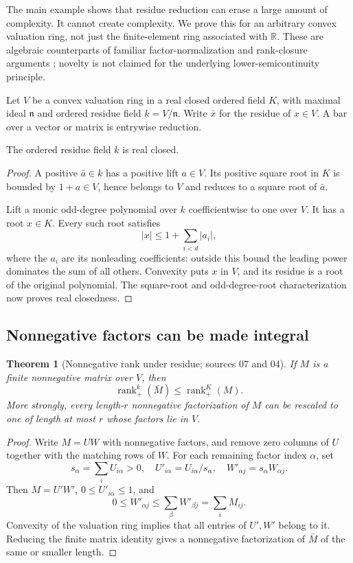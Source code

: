 \documentclass[11pt,a4paper]{article}
\numberwithin{equation}{section}
\newtheorem{theorem}{Theorem}[section]
\theoremstyle{plain}
\newcommand{\R}{\mathbb R}
\newcommand{\rankp}{\operatorname{rank}_{+}}
\begin{document}
The main example shows that residue reduction can erase a large amount of
complexity. It cannot create complexity. We prove this for an arbitrary
convex valuation ring, not just the finite-element ring associated with
$\R$. These are algebraic counterparts of familiar factor-normalization
and rank-closure arguments \cite{ic:psdrank}; novelty is not claimed for the
underlying lower-semicontinuity principle.

Let $V$ be a convex valuation ring in a real closed ordered field $K$,
with maximal ideal $\mathfrak n$ and ordered residue field
$k=V/\mathfrak n$. Write $\bar x$ for the residue of $x\in V$.
A bar over a vector or matrix is entrywise reduction.

\begin{lemma}\label{poly:ic:lem:residuercf}
The ordered residue field $k$ is real closed.
\end{lemma}
\begin{proof}
A positive $\bar a\in k$ has a positive lift $a\in V$. Its positive
square root in $K$ is bounded by $1+a\in V$, hence belongs to $V$ and
reduces to a square root of $\bar a$.

Lift a monic odd-degree polynomial over $k$ coefficientwise to one over
$V$. It has a root $x\in K$. Every such root satisfies
\[
 |x|\leq 1+\sum_{i<d}|a_i|,
\]
where the $a_i$ are its nonleading coefficients: outside this bound the
leading power dominates the sum of all others. Convexity puts $x$ in
$V$, and its residue is a root of the original polynomial. The square-root
and odd-degree-root characterization now proves real closedness.
\end{proof}

\subsection{Nonnegative factors can be made integral}
\begin{theorem}[Nonnegative rank under residue; sources 07 and 04]\label{poly:ic:thm:residuenonnegative}\label{poly:bao:prop:normalization}
If $M$ is a finite nonnegative matrix over $V$, then
\[
 \rankp^{k}(\bar M)\leq\rankp^{K}(M).
\]
More strongly, every length-$r$ nonnegative factorization of $M$ can be
rescaled to one of length at most $r$ whose factors lie in $V$.
\end{theorem}
\begin{proof}
Write $M=UW$ with nonnegative factors, and remove
zero columns of $U$ together with the matching rows of $W$. For each
remaining factor index $\alpha$, set
\[
 s_\alpha=\sum_i U_{i\alpha}>0,
 \quad U'_{i\alpha}=U_{i\alpha}/s_\alpha,
 \quad W'_{\alpha j}=s_\alpha W_{\alpha j}.
\]
Then $M=U'W'$,  $0\leq U'_{i\alpha}\leq1$, and
\[
 0\leq W'_{\alpha j}
 \leq\sum_\beta W'_{\beta j}
 =\sum_i M_{ij}.
\]
Convexity of the valuation ring implies that all entries of $U',W'$
belong to it. Reducing the finite matrix identity gives a nonnegative
factorization of $\bar M$ of the same or smaller length.
\end{proof}
\end{document}
